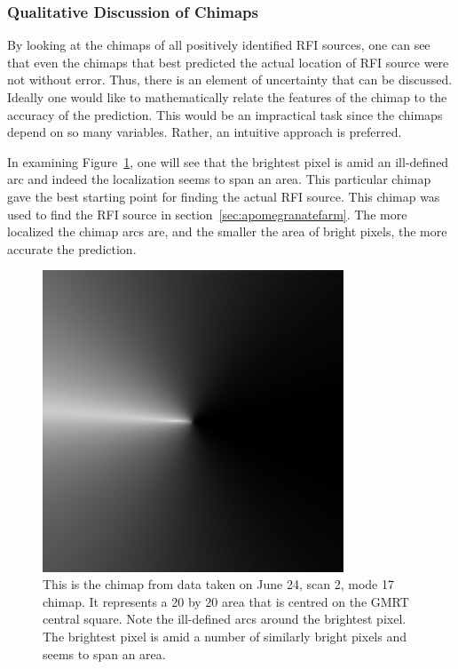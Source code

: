 \documentclass[a4paper,12pt]{article}
\begin{document}
      \subsubsection{Qualitative Discussion of Chimaps}
      \label{sec:qualitativediscussionofchimaps}

      By looking at the chimaps of all positively identified RFI sources, one can see that even the chimaps that best predicted the actual location of RFI source were not without error. Thus, there is an element of uncertainty that can be discussed. Ideally one would like to mathematically relate the features of the chimap to the accuracy of the prediction. This would be an impractical task since the chimaps depend on so many variables. Rather, an intuitive approach is preferred.

      In examining Figure~\ref{fig:june24chimapmode17}, one will see that the brightest pixel is amid an ill-defined arc and indeed the localization seems to span an area. This particular chimap gave the best starting point for finding the actual RFI source. This chimap was used to find the RFI source in section~\ref{sec:apomegranatefarm}. The more localized the chimap arcs are, and the smaller the area of bright pixels, the more accurate the prediction.  

      \begin{figure}
        \begin{center}
              \includegraphics[width=0.8\textwidth]{june24chimapmode17.pdf}
                      \end{center}
                                \caption{This is the chimap from data taken on June 24, scan 2, mode 17 chimap. It represents a \unit{20}{\kilo\metre} by \unit{20}{\kilo\metre} area that is centred on the GMRT central square. Note the ill-defined arcs around the brightest pixel. The brightest pixel is amid a number of similarly bright pixels and seems to span an area.\label{fig:june24chimapmode17}}
                                          \end{figure}
\end{document}
